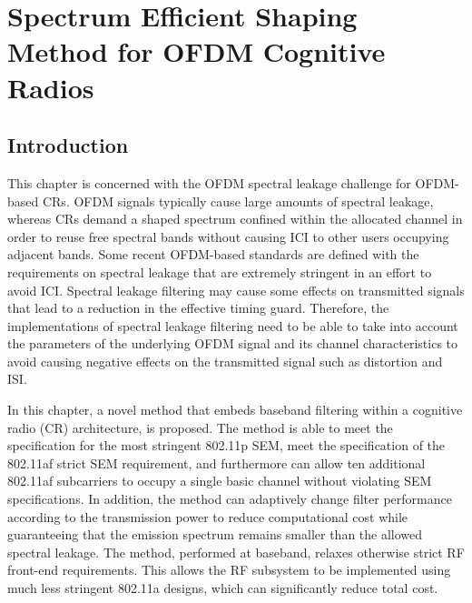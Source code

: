 \chapter{Spectrum Efficient Shaping Method for OFDM Cognitive Radios}
\label{chap:SpectralLeakage}

\section{Introduction}
\label{Sec:Intro}

This chapter is concerned with the OFDM spectral leakage challenge for OFDM-based CRs.
OFDM signals typically cause large amounts of spectral leakage, whereas CRs demand a shaped spectrum confined within the allocated channel in order to reuse free spectral bands without causing ICI to other users occupying adjacent bands.
Some recent OFDM-based standards are defined with the requirements on spectral leakage that are extremely stringent in an effort  to avoid ICI.
Spectral leakage filtering may cause some effects on transmitted signals that lead to a reduction in the effective timing guard.
Therefore, the implementations of spectral leakage filtering need to be able to take into account the parameters of the underlying OFDM signal and its channel characteristics to avoid causing negative effects on the transmitted signal such as distortion and ISI.

In this chapter, a novel method that embeds baseband filtering within a cognitive radio (CR) architecture, is proposed.
The method is able to meet the specification for the most stringent 802.11p SEM, meet the specification of the 802.11af strict SEM requirement, and furthermore can allow ten additional 802.11af subcarriers to occupy a single basic channel without violating SEM specifications.
In addition, the method can adaptively change filter performance according to the transmission power to reduce computational cost while guaranteeing that the emission spectrum remains smaller than the allowed spectral leakage.
The method, performed at baseband, relaxes otherwise strict RF front-end requirements.
This allows the RF subsystem to be implemented using much less stringent 802.11a designs, which can significantly reduce total cost.

